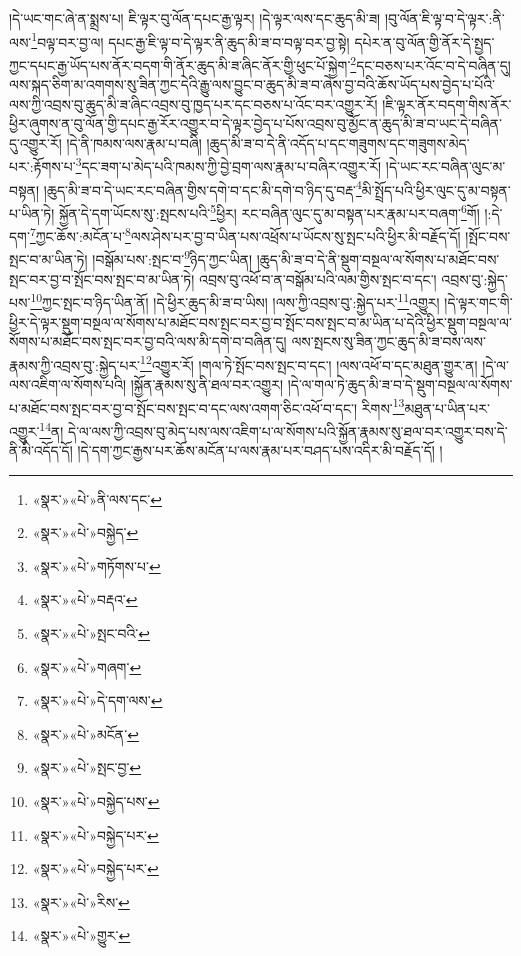 །དེ་ཡང་གང་ཞེ་ན་སྨྲས་པ། ཇི་ལྟར་བུ་ལོན་དཔང་རྒྱ་ལྟར། །དེ་ལྟར་ལས་དང་ཆུད་མི་ཟ། །བུ་ལོན་ཇི་ལྟ་བ་དེ་ལྟར་:ནི་ལས་\footnote{«སྣར་»«པེ་»ནི་ལས་དང་}བལྟ་བར་བྱ་ལ། དཔང་རྒྱ་ཇི་ལྟ་བ་དེ་ལྟར་ནི་ཆུད་མི་ཟ་བ་བལྟ་བར་བྱ་སྟེ། དཔེར་ན་བུ་ལོན་གྱི་ནོར་དེ་སྤྱད་ཀྱང་དཔང་རྒྱ་ཡོད་པས་ནོར་བདག་གི་ནོར་ཆུད་མི་ཟ་ཞིང་ནོར་གྱི་ཕུང་པོ་སྐྱེག་\footnote{«སྣར་»«པེ་»བསྐྱེད་}དང་བཅས་པར་འོང་བ་དེ་བཞིན་དུ། ལས་སྐད་ཅིག་མ་འགགས་སུ་ཟིན་ཀྱང་དེའི་རྒྱུ་ལས་བྱུང་བ་ཆུད་མི་ཟ་བ་ཞེས་བྱ་བའི་ཆོས་ཡོད་པས་བྱེད་པ་པོའི་ལས་ཀྱི་འབྲས་བུ་ཆུད་མི་ཟ་ཞིང་འབྲས་བུ་ཁྱད་པར་དང་བཅས་པ་འོང་བར་འགྱུར་རོ། །ཇི་ལྟར་ནོར་བདག་གིས་ནོར་ཕྱིར་ཞུགས་ན་བུ་ལོན་གྱི་དཔང་རྒྱ་རོར་འགྱུར་བ་དེ་ལྟར་བྱེད་པ་པོས་འབྲས་བུ་མྱོང་ན་ཆུད་མི་ཟ་བ་ཡང་དེ་བཞིན་དུ་འགྱུར་རོ། །དེ་ནི་ཁམས་ལས་རྣམ་པ་བཞི། །ཆུད་མི་ཟ་བ་དེ་ནི་འདོད་པ་དང་གཟུགས་དང་གཟུགས་མེད་པར་:རྟོགས་པ་\footnote{«སྣར་»«པེ་»གཏོགས་པ་}དང་ཟག་པ་མེད་པའི་ཁམས་ཀྱི་བྱེ་བྲག་ལས་རྣམ་པ་བཞིར་འགྱུར་རོ། །དེ་ཡང་རང་བཞིན་ལུང་མ་བསྟན། །ཆུད་མི་ཟ་བ་དེ་ཡང་རང་བཞིན་གྱིས་དགེ་བ་དང་མི་དགེ་བ་ཉིད་དུ་བརྡ་\footnote{«སྣར་»«པེ་»བརྡའ་}མི་སྤྲོད་པའི་ཕྱིར་ལུང་དུ་མ་བསྟན་པ་ཡིན་ཏེ། སྐྱོན་དེ་དག་ཡོངས་སུ་:སྤངས་པའི་\footnote{«སྣར་»«པེ་»སྤང་བའི་}ཕྱིར། རང་བཞིན་ལུང་དུ་མ་བསྟན་པར་རྣམ་པར་བཞག་\footnote{«སྣར་»«པེ་»གཞག་}གོ། །:དེ་དག་\footnote{«སྣར་»«པེ་»དེ་དག་ལས་}ཀྱང་ཆོས་:མངོན་པ་\footnote{«སྣར་»«པེ་»མངོན་}ལས་ཤེས་པར་བྱ་བ་ཡིན་པས་འཕྲོས་པ་ཡོངས་སུ་སྤང་པའི་ཕྱིར་མི་བརྗོད་དོ། །སྤོང་བས་སྤང་བ་མ་ཡིན་ཏེ། །བསྒོམ་པས་:སྤང་བ་\footnote{«སྣར་»«པེ་»སྤང་བྱ་}ཉིད་ཀྱང་ཡིན། །ཆུད་མི་ཟ་བ་དེ་ནི་སྡུག་བསྔལ་ལ་སོགས་པ་མཐོང་བས་སྤང་བར་བྱ་བ་སྤོང་བས་སྤང་བ་མ་ཡིན་ཏེ། འབྲས་བུ་འཕོ་བ་ན་བསྒོམ་པའི་ལམ་གྱིས་སྤང་བ་དང་། འབྲས་བུ་:སྐྱེད་པས་\footnote{«སྣར་»«པེ་»བསྐྱེད་པས་}ཀྱང་སྤང་བ་ཉིད་ཡིན་ནོ། །དེ་ཕྱིར་ཆུད་མི་ཟ་བ་ཡིས། །ལས་ཀྱི་འབྲས་བུ་:སྐྱེད་པར་\footnote{«སྣར་»«པེ་»བསྐྱེད་པར་}འགྱུར། །དེ་ལྟར་གང་གི་ཕྱིར་དེ་ལྟར་སྡུག་བསྔལ་ལ་སོགས་པ་མཐོང་བས་སྤང་བར་བྱ་བ་སྤོང་བས་སྤང་བ་མ་ཡིན་པ་དེའི་ཕྱིར་སྡུག་བསྔལ་ལ་སོགས་པ་མཐོང་བས་སྤང་བར་བྱ་བའི་ལས་མི་དགེ་བ་བཞིན་དུ། ལས་སྤངས་སུ་ཟིན་ཀྱང་ཆུད་མི་ཟ་བས་ལས་རྣམས་ཀྱི་འབྲས་བུ་:སྐྱེད་པར་\footnote{«སྣར་»«པེ་»བསྐྱེད་པར་}འགྱུར་རོ། །གལ་ཏེ་སྤོང་བས་སྤང་བ་དང་། །ལས་འཕོ་བ་དང་མཐུན་གྱུར་ན། །དེ་ལ་ལས་འཇིག་ལ་སོགས་པའི། །སྐྱོན་རྣམས་སུ་ནི་ཐལ་བར་འགྱུར། །དེ་ལ་གལ་ཏེ་ཆུད་མི་ཟ་བ་དེ་སྡུག་བསྔལ་ལ་སོགས་པ་མཐོང་བས་སྤང་བར་བྱ་བ་སྤོང་བས་སྤང་བ་དང་ལས་འགག་ཅིང་འཕོ་བ་དང་། རིགས་\footnote{«སྣར་»«པེ་»རིས་}མཐུན་པ་ཡིན་པར་འགྱུར་\footnote{«སྣར་»«པེ་»གྱུར་}ན། དེ་ལ་ལས་ཀྱི་འབྲས་བུ་མེད་པས་ལས་འཇིག་པ་ལ་སོགས་པའི་སྐྱོན་རྣམས་སུ་ཐལ་བར་འགྱུར་བས་དེ་ནི་མི་འདོད་དོ། །དེ་དག་ཀྱང་རྒྱས་པར་ཆོས་མངོན་པ་ལས་རྣམ་པར་བཤད་པས་འདིར་མི་བརྗོད་དོ། །
